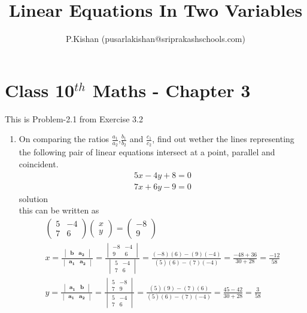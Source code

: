\documentclass[10pt]{article}
\title{Linear Equations In Two Variables}
\author{P.Kishan (pusarlakishan@sriprakashschools.com)}
\newcommand{\myvec}[1]{\ensuremath{\begin{pmatrix}#1\end{pmatrix}}}
\newcommand{\mydet}[1]{\ensuremath{\begin{vmatrix}#1\end{vmatrix}}}
\let\vec\mathbf
\begin{document}
\maketitle
\section*{Class 10$^{th}$ Maths - Chapter 3}
This is Problem-2.1 from Exercise 3.2
\begin{enumerate}
\item On comparing the ratios $\frac{a_1}{a_2}$,$\frac{b_1}{b_2}$ and $\frac{c_1}{c_2}$, find out wether the lines representing the following pair of linear equations intersect at a point, parallel and coincident.\\
\begin{align} 
5x-4y+8=0\\
7x+6y-9=0
\end{align}
solution \\
this can be written as \\
\begin{align}
\myvec{5&-4\\7&6}\myvec{x\\y}=\myvec{-8\\9}\\   
x=\frac{\mydet{ \vec{b} & \vec{a_2}}}{\mydet{ \vec{a_1} &\vec{a_2} }}=
\frac{\mydet{-8&-4 \\ 9 & 6 }}{\mydet{5&-4\\7&6}} =
\frac{(-8)(6)-(9)(-4)}{(5)(6)-(7)(-4)} =
\frac{-48+36}{30+28}=\frac{-12}{58}\\
y=\frac{\mydet{\vec{a_1}&\vec{b}}}{\mydet{\vec{a_1}&\vec{a_2}}} =
\frac{\mydet{5&-8\\7&9}}{\mydet{5&-4\\7&6}}=
\frac{(5)(9)-(7)(6)}{(5)(6)-(7)(-4)}=
\frac{45-42}{30+28}=\frac{3}{58} 
\end{align}
\end{enumerate}
\end{document}
